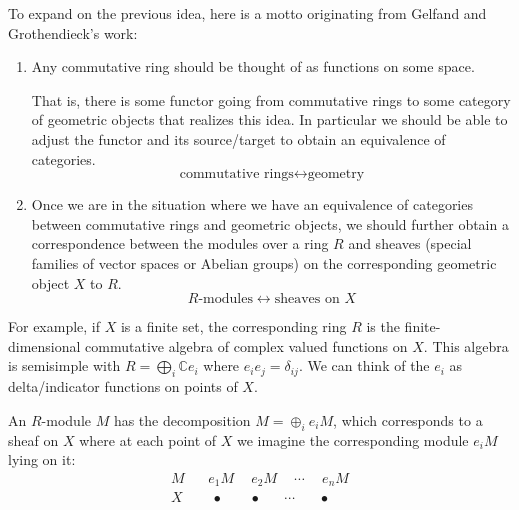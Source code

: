 \documentclass[11pt,leqno]{article}
\theoremstyle{plain}
\theoremstyle{definition}
\numberwithin{equation}{section}
\numberwithin{lem}{section}
\begin{document}
To expand on the previous idea, here is a motto originating from Gelfand and Grothendieck's work:
\begin{enumerate}
  \item Any commutative ring should be thought of as functions on some space.
  
  That is, there is some functor going from commutative rings to some category of geometric objects that realizes this idea. In particular we should be able to adjust the functor and its source/target to obtain an equivalence of categories.
  \[\text{commutative rings}\longleftrightarrow \text{geometry}\]
  \item Once we are in the situation where we have an equivalence of categories between commutative rings and geometric objects, we should further obtain a correspondence between the modules over a ring $R$ and sheaves (special families of vector spaces or Abelian groups) on the corresponding geometric object $X$ to $R$.
  \[R\text{-modules}\longleftrightarrow \text{sheaves on }X\]
\end{enumerate}
For example, if $X$ is a finite set, the corresponding ring $R$ is the finite-dimensional commutative algebra of complex valued functions on $X$. This algebra is semisimple with $R = \bigoplus_i \mathbb Ce_i$ where $e_ie_j = \delta_{ij}$. We can think of the $e_i$ as delta/indicator functions on points of $X$.

An $R$-module $M$ has the decomposition $M = \oplus_i e_i M$, which corresponds to a sheaf on $X$ where at each point of $X$ we imagine the corresponding module $e_iM$ lying on it:
\begin{align*}
  M &~~~~ e_1M \phantom{\oplus} e_2M \phantom{\oplus} \cdots \phantom{\oplus} e_n M\\
  X&~~~~~\bullet~\phantom{\oplus}~~\bullet~~\phantom{\oplus} \cdots \phantom{\oplus}~~\bullet
\end{align*}
\end{document}
